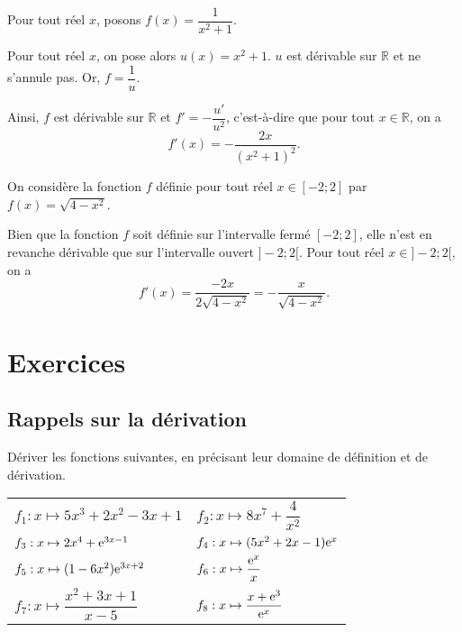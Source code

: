 \documentclass[11pt,fleqn, openany]{book} %
\begin{document}
\begin{example}Pour tout réel $x$, posons $f(x)=\dfrac{1}{x^2+1}$. 

Pour tout réel $x$, on pose alors $u(x)=x^2+1$. $u$ est dérivable sur $\mathbb{R}$ et ne s'annule pas. Or, $f=\dfrac{1}{u}$.

 Ainsi, $f$ est dérivable sur $\mathbb{R}$ et $f'=-\dfrac{u'}{u^2}$, c'est-à-dire que pour tout $x\in \mathbb{R}$, on a
\[ f'(x)=- \dfrac{2x}{(x^2+1)^2}.\]\end{example}

\begin{example}On considère la fonction $f$ définie pour tout réel $x\in[-2;2]$ par $f(x)=\sqrt{4-x^2}$.

Bien que la fonction $f$ soit définie sur l'intervalle fermé $[-2;2]$, elle n'est en revanche dérivable que sur l'intervalle ouvert $]-2;2[$. Pour tout réel $x\in]-2;2[$, on a
\[f'(x)=\dfrac{-2x}{2\sqrt{4-x^2}}=-\dfrac{x}{\sqrt{4-x^2}}.\]\end{example}

\chapter{Exercices}
\setcounter{section}{0}
\section*{Rappels sur la dérivation}

\begin{exercise}Dériver les fonctions suivantes, en précisant leur domaine de définition et de dérivation.

\renewcommand{\arraystretch}{2}
\begin{tabularx}{\linewidth}{XX}
 $f_1 : x \mapsto 5x^3+2x^2-3x+1$ &
$f_2 : x \mapsto 8x^7+\dfrac{4}{x^2}$ \\
 $f_3 : x \mapsto 2x^4 + \mathrm{e}^{3x-1}$ &
 $f_4 : x \mapsto (5x^2+2x-1)\mathrm{e}^x$ \\
$f_5 : x \mapsto (1-6x^2)\mathrm{e}^{3x+2}$ &
$f_6 : x \mapsto \dfrac{\mathrm{e}^x}{x}$ \\
$f_7 : x \mapsto \dfrac{x^2+3x+1}{x-5}$ &
$f_8 : x \mapsto \dfrac{x+\mathrm{e}^3}{\mathrm{e}^x}$
\end{tabularx}\end{exercise}
\end{document}
